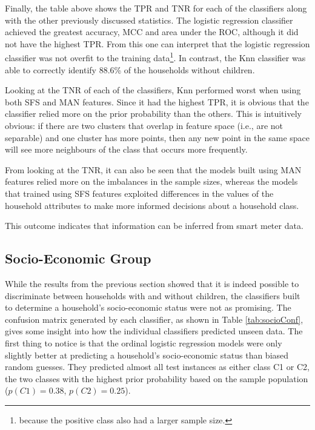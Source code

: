 \childResults

Finally, the table above shows the TPR and TNR for each of the classifiers along with the other previously discussed statistics. The logistic regression classifier achieved the greatest accuracy, MCC and area under the ROC, although it did not have the highest TPR.  From this one can interpret that the logistic regression classifier was not overfit to the training data\footnote{because the positive class also had a larger sample size.}.  In contrast, the Knn classifier was able to correctly identify 88.6\% of the households without children. 

Looking at the TNR of each of the classifiers, Knn performed worst when using both SFS and MAN features. Since it had the highest TPR, it is obvious that the classifier relied more on the prior probability than the others. This is intuitively obvious: if there are two clusters that overlap in feature space (i.e., are not separable) and one cluster has more points, then any new point in the same space will see more neighbours of the class that occurs more frequently. 

From looking at the TNR, it can also be seen that the models built using MAN features relied more on the imbalances in the sample sizes, whereas the models that trained using SFS features exploited differences in the values of the household attributes to make more informed decisions about a household class. 

This outcome indicates that information can be inferred from smart meter data.

 
\subsection{Socio-Economic Group}


While the results from the previous section showed that it is indeed possible to discriminate between households with and without children, the classifiers built to determine a household's socio-economic status were not as promising.  The confusion matrix generated by each classifier, as shown in Table \ref{tab:socioConf}, gives some insight into how the individual classifiers predicted unseen data. The first thing to notice is that the ordinal logistic regression models were only slightly better at predicting a household's socio-economic status than biased random guesses. They predicted almost all test instances as either class C1 or C2, the two classes with the highest prior probability based on the sample population ($p(C1)=0.38$, $p(C2)=0.25$).  

